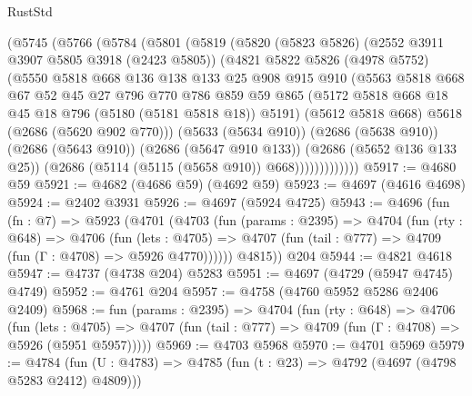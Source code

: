 \begin{lexlean}{RustStd}
\begin{coremodule}
          (@5745
            (@5766
              (@5784
                (@5801
                  (@5819
                    (@5820
                      (@5823 @5826)
                      (@2552 @3911 @3907 @5805 @3918 (@2423 @5805))
                      (@4821
                        @5822
                        @5826
                        (@4978 @5752)
                        (@5550
                          @5818
                          @668
                          @136
                          @138
                          @133
                          @25
                          @908
                          @915
                          @910
                          (@5563
                            @5818
                            @668
                            @67
                            @52
                            @45
                            @27
                            @796
                            @770
                            @786
                            @859
                            @59
                            @865
                            (@5172 @5818 @668 @18 @45 @18 @796 (@5180 (@5181 @5818 @18)) @5191)
                            (@5612 @5818 @668)
                            @5618
                            (@2686 (@5620 @902 @770)))
                          (@5633 (@5634 @910))
                          (@2686 (@5638 @910))
                          (@2686 (@5643 @910))
                          (@2686 (@5647 @910 @133))
                          (@2686 (@5652 @136 @133 @25))
                          (@2686 (@5114 (@5115 (@5658 @910)) @668)))))))))))))
@5917 := @4680 @59
@5921 := @4682 (@4686 @59) (@4692 @59)
@5923 := @4697 (@4616 @4698)
@5924 := @2402 @3931
@5926 := @4697 (@5924 @4725)
@5943 := @4696
    (fun (fn : @7) =>
    @5923
      (@4701
        (@4703
          (fun (params : @2395) =>
          @4704
            (fun (rty : @648) =>
            @4706
              (fun (lets : @4705) =>
              @4707 (fun (tail : @777) => @4709 (fun (Γ : @4708) => @5926 @4770))))))
        @4815))
    @204
@5944 := @4821 @4618
@5947 := @4737 (@4738 @204) @5283
@5951 := @4697 (@4729 (@5947 @4745) @4749)
@5952 := @4761 @204
@5957 := @4758 (@4760 @5952 @5286 @2406 @2409)
@5968 := fun (params : @2395) =>
  @4704
    (fun (rty : @648) =>
    @4706
      (fun (lets : @4705) =>
      @4707 (fun (tail : @777) => @4709 (fun (Γ : @4708) => @5926 (@5951 @5957)))))
@5969 := @4703 @5968
@5970 := @4701 @5969
@5979 := @4784 (fun (U : @4783) => @4785 (fun (t : @23) => @4792 (@4697 (@4798 @5283 @2412) @4809)))

\end{coremodule}
\end{lexlean}
